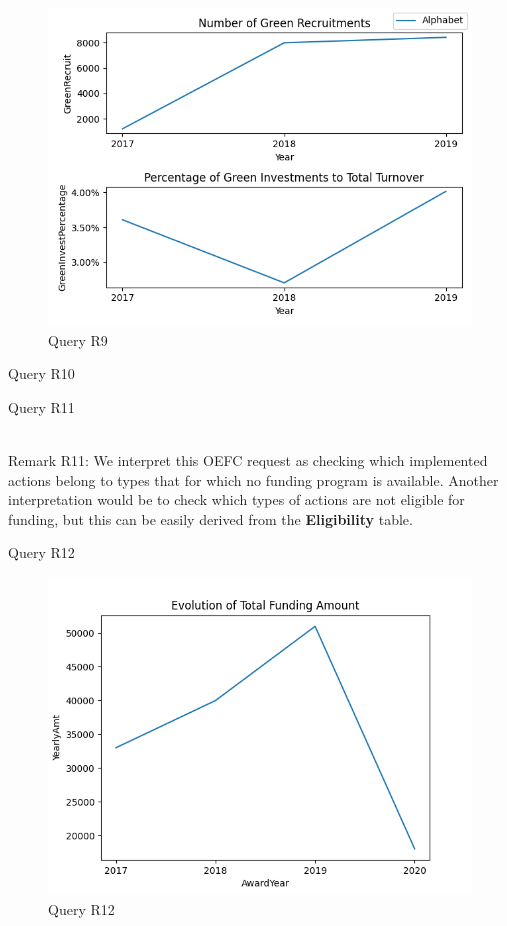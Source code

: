 \begin{figure}[h!]
    \centering
    \caption{Query R9}
    \label{fig:R9}
    \includegraphics[width=16cm]{R9_plot.png}
\end{figure}

\begin{table}[!htb]
    \caption{Query R10}
	
\end{table}

\begin{table}[!htb]
    \caption{Query R11}
	 \\
    Remark R11: We interpret this OEFC request as checking which implemented actions belong to types that for which no funding
program is available.
Another interpretation would be to check which types of actions are not eligible for funding, but this can be easily derived
from the \textbf{Eligibility} table.
\end{table}



\begin{table}[!htb]
    \caption{Query R12}
	
\end{table}

\begin{figure}[!htb]
    \centering
    \caption{Query R12}
    \label{fig:R12}
    \includegraphics[width=16cm]{R12_plot.png}
\end{figure}

